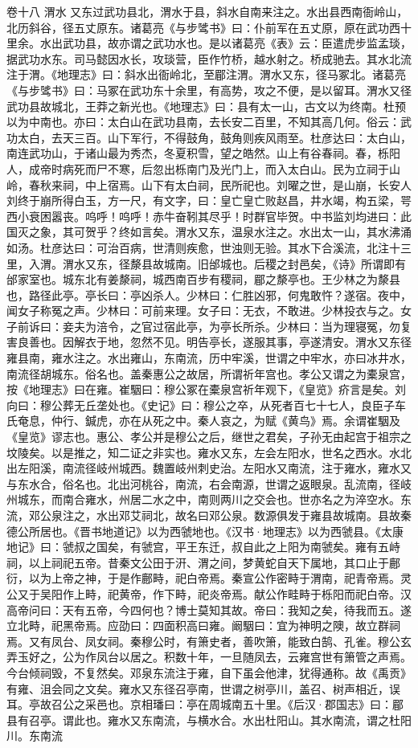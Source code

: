 \documentclass[12pt,UTF8]{ctexbook}
\begin{document}
卷十八  渭水 
又东过武功县北，渭水于县，斜水自南来注之。水出县西南衙岭山，北历斜谷，径五丈原东。诸葛亮《与步骘书》曰：仆前军在五丈原，原在武功西十里余。水出武功县，故亦谓之武功水也。是以诸葛亮《表》云：臣遣虎步监孟琰，据武功水东。司马懿因水长，攻琰营，臣作竹桥，越水射之。桥成驰去。其水北流注于渭。《地理志》曰：斜水出衙岭北，至郿注渭。渭水又东，径马冢北。诸葛亮《与步骘书》曰：马冢在武功东十余里，有高势，攻之不便，是以留耳。渭水又径武功县故城北，王莽之新光也。《地理志》曰：县有太一山，古文以为终南。杜预以为中南也。亦曰：太白山在武功县南，去长安二百里，不知其高几何。俗云：武功太白，去天三百。山下军行，不得鼓角，鼓角则疾风雨至。杜彦达曰：太白山，南连武功山，于诸山最为秀杰，冬夏积雪，望之皓然。山上有谷春祠。春，栎阳人，成帝时病死而尸不寒，后忽出栎南门及光门上，而入太白山。民为立祠于山岭，春秋来祠，中上宿焉。山下有太白祠，民所祀也。刘曜之世，是山崩，长安人刘终于崩所得白玉，方一尺，有文字，曰：皇亡皇亡败赵昌，井水竭，构五梁，咢西小衰困嚣丧。呜呼！呜呼！赤牛奋靷其尽乎！时群官毕贺。中书监刘均进曰：此国灭之象，其可贺乎？终如言矣。渭水又东，温泉水注之。水出太一山，其水沸涌如汤。杜彦达曰：可治百病，世清则疾愈，世浊则无验。其水下合溪流，北注十三里，入渭。渭水又东，径漦县故城南。旧邰城也。后稷之封邑矣，《诗》所谓即有邰家室也。城东北有姜漦祠，城西南百步有稷祠，郿之漦亭也。王少林之为漦县也，路径此亭。亭长曰：亭凶杀人。少林曰：仁胜凶邪，何鬼敢忤？遂宿。夜中，闻女子称冤之声。少林曰：可前来理。女子曰：无衣，不敢进。少林投衣与之。女子前诉曰：妾夫为涪令，之官过宿此亭，为亭长所杀。少林曰：当为理寝冤，勿复害良善也。因解衣于地，忽然不见。明告亭长，遂服其事，亭遂清安。渭水又东径雍县南，雍水注之。水出雍山，东南流，历中牢溪，世谓之中牢水，亦曰冰井水，南流径胡城东。俗名也。盖秦惠公之故居，所谓祈年宫也。孝公又谓之为橐泉宫，按《地理志》曰在雍。崔駰曰：穆公冢在橐泉宫祈年观下，《皇览》疥言是矣。刘向曰：穆公葬无丘垄处也。《史记》曰：穆公之卒，从死者百七十七人，良臣子车氏奄息，仲行、鍼虎，亦在从死之中。秦人哀之，为赋《黄鸟》焉。余谓崔駰及《皇览》谬志也。惠公、孝公并是穆公之后，继世之君矣，子孙无由起宫于祖宗之坟陵矣。以是推之，知二证之非实也。雍水又东，左会左阳水，世名之西水。水北出左阳溪，南流径岐州城西。魏置岐州刺史治。左阳水又南流，注于雍水，雍水又与东水合，俗名也。北出河桃谷，南流，右会南源，世谓之返眼泉。乱流南，径岐州城东，而南合雍水，州居二水之中，南则两川之交会也。世亦名之为淬空水。东流，邓公泉注之，水出邓艾祠北，故名曰邓公泉。数源俱发于雍县故城南。县故秦德公所居也。《晋书地道记》以为西虢地也。《汉书·地理志》以为西虢县。《太康地记》曰：虢叔之国矣，有虢宫，平王东迁，叔自此之上阳为南虢矣。雍有五峙祠，以上祠祀五帝。昔秦文公田于汧、渭之间，梦黄蛇自天下属地，其口止于鄜衍，以为上帝之神，于是作鄜畤，祀白帝焉。秦宣公作密畤于渭南，祀青帝焉。灵公又于吴阳作上畤，祀黄帝，作下畤，祀炎帝焉。献公作畦畤于栎阳而祀白帝。汉高帝问曰：天有五帝，今四何也？博士莫知其故。帝曰：我知之矣，待我而五。遂立北畤，祀黑帝焉。应劭曰：四面积高曰雍。阚駰曰：宜为神明之隩，故立群祠焉。又有凤台、凤女祠。秦穆公时，有箫史者，善吹箫，能致白鹄、孔雀。穆公玄弄玉好之，公为作凤台以居之。积数十年，一旦随凤去，云雍宫世有箫管之声焉。今台倾祠毁，不复然矣。邓泉东流注于雍，自下虽会他津，犹得通称。故《禹贡》有雍、沮会同之文矣。雍水又东径召亭南，世谓之树亭川，盖召、树声相近，误耳。亭故召公之采邑也。京相璠曰：亭在周城南五十里。《后汉·郡国志》曰：郿县有召亭。谓此也。雍水又东南流，与横水合。水出杜阳山。其水南流，谓之杜阳川。东南流
\end{document}
